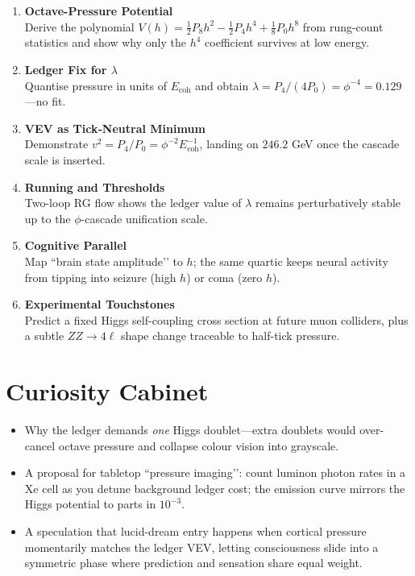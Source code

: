 \documentclass[11pt,oneside]{book}
\begin{document}
{\begin{enumerate}[label=\textbf{\arabic*.},leftmargin=1.25cm]
\item \textbf{Octave-Pressure Potential}\\[-6pt]
      Derive the polynomial
      $V(h)=\tfrac12 P_{\!8}h^{2}-\tfrac12 P_{\!4}h^{4}+\tfrac18P_{\!0}h^{8}$
      from rung-count statistics and show why only the $h^{4}$ coefficient
      survives at low energy.
\item \textbf{Ledger Fix for $\lambda$}\\[-6pt]
      Quantise pressure in units of $E_{\text{coh}}$ and obtain
      $\lambda=P_{\!4}/(4P_{\!0}) = \phi^{-4}=0.129\,$—no fit.
\item \textbf{VEV as Tick‐Neutral Minimum}\\[-6pt]
      Demonstrate $v^{2}=P_{\!4}/P_{\!0}= \phi^{-2}\!E_{\text{coh}}^{-1}$,
      landing on $246.2$ GeV once the cascade scale is inserted.
\item \textbf{Running and Thresholds}\\[-6pt]
      Two-loop RG flow shows the ledger value of $\lambda$ remains
      perturbatively stable up to the $\phi$-cascade unification scale.
\item \textbf{Cognitive Parallel}\\[-6pt]
      Map “brain state amplitude’’ to $h$; the same quartic keeps neural
      activity from tipping into seizure (high $h$) or coma (zero $h$).
\item \textbf{Experimental Touchstones}\\[-6pt]
      Predict a fixed Higgs self-coupling cross section at future muon
      colliders, plus a subtle $ZZ\to4\ell$ shape change traceable to
      half-tick pressure.
\end{enumerate}

\section*{Curiosity Cabinet}

\begin{itemize}
\item Why the ledger demands \textit{one} Higgs doublet—extra doublets
      would over-cancel octave pressure and collapse colour vision into
      grayscale.
\item A proposal for tabletop “pressure imaging’’: count luminon photon
      rates in a Xe cell as you detune background ledger cost; the
      emission curve mirrors the Higgs potential to parts in $10^{-3}$.
\item A speculation that lucid-dream entry happens when cortical
      pressure momentarily matches the ledger VEV, letting consciousness
      slide into a symmetric phase where prediction and sensation share
      equal weight.
\end{itemize}

}
\end{document}
